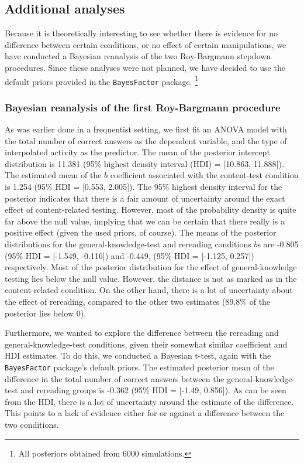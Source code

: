 \documentclass[11pt,]{article}
\let\rmarkdownfootnote\footnote%
\def\footnote{\protect\rmarkdownfootnote}
\begin{document}
\hypertarget{additional-analyses}{%
\subsection{Additional analyses}\label{additional-analyses}}

Because it is theoretically interesting to see whether there is evidence
for no difference between certain conditions, or no effect of certain
manipulations, we have conducted a Bayesian reanalysis of the two
Roy-Bargmann stepdown procedures. Since these analyses were not planned,
we have decided to use the default priors provided in the
\texttt{BayesFactor} \citep{moreyBayesFactorComputationBayes2018}
package. \footnote{All posteriors obtained from 6000 simulations.}

\hypertarget{bayesian-reanalysis-of-the-first-roy-bargmann-procedure}{%
\subsubsection{Bayesian reanalysis of the first Roy-Bargmann
procedure}\label{bayesian-reanalysis-of-the-first-roy-bargmann-procedure}}

As was earlier done in a frequentist setting, we first fit an ANOVA
model with the total number of correct answers as the dependent
variable, and the type of interpolated activity as the predictor. The
mean of the posterior intercept distribution is 11.381 (95\% highest
density interval (HDI) = {[}10.863, 11.888{]}). The estimated mean of
the \(b\) coefficient associated with the content-test condition is
1.254 (95\% HDI = {[}0.553, 2.005{]}). The 95\% highest density interval
for the posterior indicates that there is a fair amount of uncertainty
around the exact effect of content-related testing. However, most of the
probability density is quite far above the null value, implying that we
can be certain that there really is a positive effect (given the used
priors, of course). The means of the posterior distributions for the
general-knowledge-test and rereading conditions \(b\)s are -0.805 (95\%
HDI = {[}-1.549, -0.116{]}) and -0.449, (95\% HDI = {[}-1.125, 0.257{]})
respectively. Most of the posterior distribution for the effect of
general-knowledge testing lies below the null value. However, the
distance is not as marked as in the content-related condition. On the
other hand, there is a lot of uncertainty about the effect of rereading,
compared to the other two estimates (89.8\% of the posterior lies below
0).

Furthermore, we wanted to explore the difference between the rereading
and general-knowledge-test conditions, given their somewhat similar
coefficient and HDI estimates. To do this, we conducted a Bayesian
t-test, again with the \texttt{BayesFactor} package's default priors.
The estimated posterior mean of the difference in the total number of
correct answers between the general-knowledge-test and rereading groups
is -0.362 (95\% HDI = {[}-1.49, 0.856{]}). As can be seen from the HDI,
there is a lot of uncertainty around the estimate of the difference.
This points to a lack of evidence either for or against a difference
between the two conditions.
\end{document}
